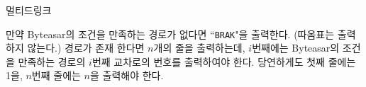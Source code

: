 \begin{problem}{멀티드링크}
	\OutputFile
	
	만약 Byteasar의 조건을 만족하는 경로가 없다면 ``\texttt{BRAK}"을 출력한다.  (따옴표는 출력하지 않는다.) 경로가 존재 한다면 $n$개의 줄을 출력하는데, $i$번째에는 Byteasar의 조건을 만족하는 경로의 $i$번째 교차로의 번호를 출력하여야 한다. 당연하게도 첫째 줄에는 1을, $n$번째 줄에는 $n$을 출력해야 한다.
	
	 
	\Examples
		
	\begin{example}
	\end{example}
        
\end{problem}

